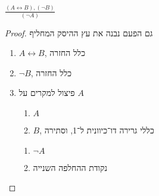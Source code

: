 \subquestion{}
$\frac{(A \leftrightarrow B), (\lnot B)}{(\lnot A)}$
\begin{proof}
	גם הפעם נבנה את עץ ההיסק המחליף
	\begin{enumerate}
		\item $A \leftrightarrow B$, כלל החזרה
		\item $\lnot B$, כלל החזרה
		\item פיצול למקרים על $A$
			\begin{enumerate}
				\item $A$
				\item $B$, כללי גרירה דו־כיוונית ל־1, וסתירה
			\end{enumerate}
			\begin{enumerate}
				\item $\lnot A$
				\item נקודת ההחלפה השנייה
			\end{enumerate}
	\end{enumerate}
\end{proof}


